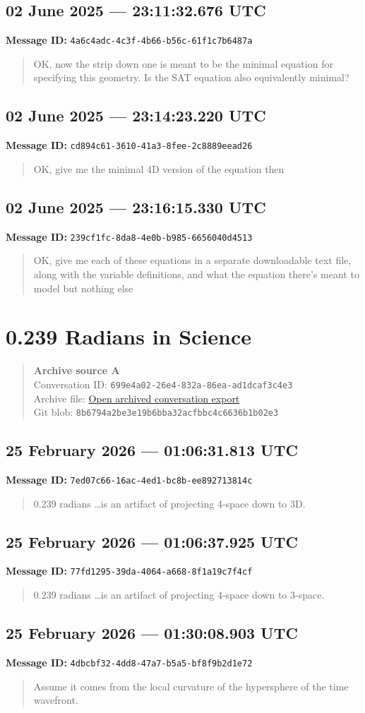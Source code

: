 \documentclass[11pt,letterpaper]{article}
\newcommand{\messageentry}[3]{%
  \Needspace{7\baselineskip}
  \subsection*{#1}
  {\small\textbf{Message ID:} \texttt{#2}}
  \vspace{2pt}
}
\newcommand{\sourceblock}[4]{%
  \begin{quote}\small
  \textbf{#1}\\
  Conversation ID: \texttt{#2}\\
  Archive file: \href{#3}{Open archived conversation export}\\
  Git blob: \texttt{#4}
  \end{quote}
}
\begin{document}
\messageentry{02 June 2025 --- 23:11:32.676 UTC}{4a6c4adc-4c3f-4b66-b56c-61f1c7b6487a}{}
\begin{quote}\small
OK, now the strip down one is meant to be the minimal equation for specifying this geometry. Is the SAT equation also equivalently minimal?
\end{quote}

\messageentry{02 June 2025 --- 23:14:23.220 UTC}{cd894c61-3610-41a3-8fee-2c8889eead26}{}
\begin{quote}\small
OK, give me the minimal 4D version of the equation then
\end{quote}

\messageentry{02 June 2025 --- 23:16:15.330 UTC}{239cf1fc-8da8-4e0b-b985-6656040d4513}{}
\begin{quote}\small
OK, give me each of these equations in a separate downloadable text file, along with the variable definitions, and what the equation there’s meant to model but nothing else
\end{quote}


\section*{0.239 Radians in Science}
\sourceblock{Archive source A}{699e4a02-26e4-832a-86ea-ad1dcaf3c4e3}{https://github.com/Satobloc/HsH/blob/main/DEVELOPMENT_FULL_CONVOS/SAT_CONVOS_13/26.02.24\%E2\%80\%A226.09.08\%E2\%80\%A2\%F0\%9F\%A7\%AE\%200.239\%20Radians\%20in\%20Science\%20\%E2\%80\%94\%20raw.json}{8b6794a2\hspace{0pt}be3e19b6\hspace{0pt}bba32acf\hspace{0pt}bbc4c663\hspace{0pt}6b1b02e3}

\messageentry{25 February 2026 --- 01:06:31.813 UTC}{7ed07c66-16ac-4ed1-bc8b-ee892713814c}{}
\begin{quote}
0.239 radians …is an artifact of projecting 4-space down to 3D.
\end{quote}

\messageentry{25 February 2026 --- 01:06:37.925 UTC}{77fd1295-39da-4064-a668-8f1a19c7f4cf}{}
\begin{quote}
0.239 radians …is an artifact of projecting 4-space down to 3-space.
\end{quote}

\messageentry{25 February 2026 --- 01:30:08.903 UTC}{4dbcbf32-4dd8-47a7-b5a5-bf8f9b2d1e72}{}
\begin{quote}
Assume it comes from the local curvature of the hypersphere of the time wavefront.
\end{quote}
\end{document}
